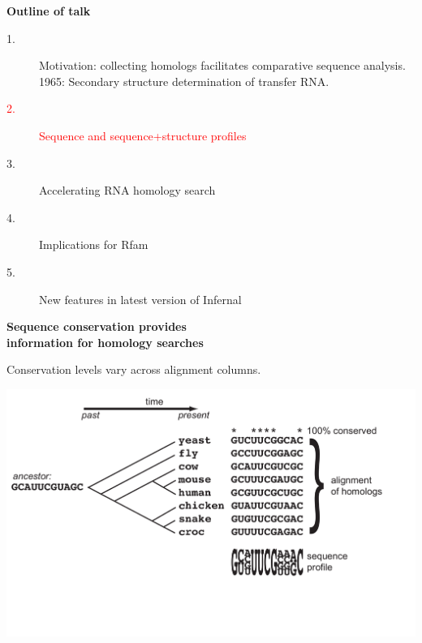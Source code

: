 \documentclass[landscape]{slides}
\begin{document}
\begin{slide}
\begin{slide}
\vfill
\end{slide}
\begin{slide}
\begin{center}
\textbf{Outline of talk}

\begin{description}
\item[1.] Motivation: collecting homologs facilitates comparative
  sequence analysis.\\ 1965: Secondary structure determination of
  transfer RNA.
\item[\textcolor{red}{2.}] \textcolor{red}{Sequence and sequence+structure profiles}
\item[3.] Accelerating RNA homology search
\item[4.] Implications for Rfam
\item[5.] New features in latest version of Infernal
\end{description}

\end{center}
\vfill
\end{slide}
\begin{slide}
\begin{center}
\textbf{Sequence conservation provides \\ information for homology searches}

\medskip
Conservation levels vary across alignment columns.

\includegraphics[width=10in]{figs/seqstructprofiles-seq1}
\end{center}


\end{slide}
\end{slide}
\end{document}

